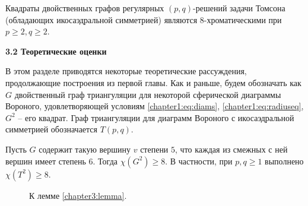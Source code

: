 \begin{hypothesis}
Квадраты двойственных графов регулярных $(p,q)$-решений задачи Томсона (обладающих икосаэдральной симметрией) 
являются $8$-хроматическими при $p \ge 2, q \ge 2$.
\end{hypothesis}

\vspace{5pt}
\textbf{3.2 Теоретические оценки}\label{chapters:3.2}
\vspace{5pt}

В этом разделе приводятся некоторые теоретические рассуждения, продолжающие построения из первой главы. 
Как и раньше, будем обозначать как $G$ двойственный граф триангуляции для некоторой сферической диаграммы Вороного, 
удовлетворяющей условиям \ref{chapter1:eq:diams}, \ref{chapter1:eq:radiuseq}, $G^2$ -- его квадрат. 
Граф триангуляции для диаграмм Вороного с икосаэдральной симметрией обозначается $T(p,q)$.

\begin{lemma}\label{chapter3:lemma}
Пусть $G$ содержит такую вершину $v$ степени $5$, что каждая из смежных с ней вершин имеет степень $6$. 
Тогда $\chi(G^2) \ge 8$. В частности, при $p,q \ge 1$ выполнено $\chi(T^2) \ge 8$.
\end{lemma}

\begin{figure}[h]
\centering
\captionsetup{justification=centering}
\caption{К лемме \ref{chapter3:lemma}.}
\label{chapter3:fig:lemma}
\end{figure}

